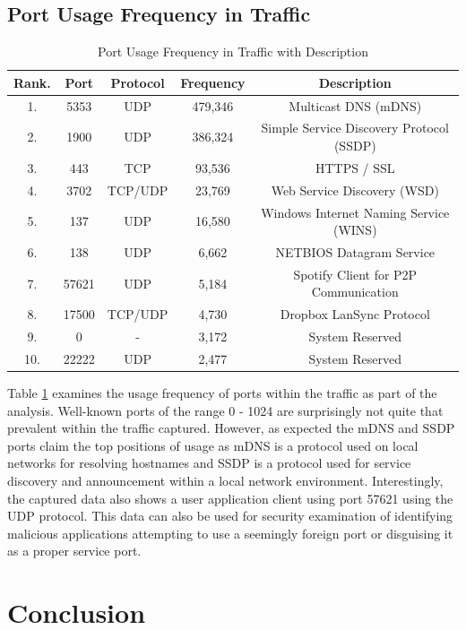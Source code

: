 \documentclass{article}
\begin{document}
\subsection{Port Usage Frequency in Traffic}

\begin{table}[H]
    \centering
    \begin{tabular}{ccccc}
         Rank. & Port & Protocol & Frequency & Description \\
         \hline
         1. & 5353 & UDP & 479,346 & Multicast DNS (mDNS)\\
         2. & 1900 & UDP & 386,324 & Simple Service Discovery Protocol (SSDP) \\
         3. & 443 & TCP & 93,536 & HTTPS / SSL\\
         4. & 3702 & TCP/UDP & 23,769 & Web Service Discovery (WSD) \\
         5. & 137 & UDP & 16,580 & Windows Internet Naming Service (WINS) \\
         6. & 138 & UDP & 6,662 & NETBIOS Datagram Service \\
         7. & 57621 & UDP & 5,184 &  Spotify Client for P2P Communication \\
         8. & 17500 & TCP/UDP & 4,730 & Dropbox LanSync Protocol \\
         9. & 0 & - & 3,172 & System Reserved \\
         10. & 22222 & UDP & 2,477 & System Reserved \\
    \end{tabular}
    \caption{Port Usage Frequency in Traffic with Description}
    \label{tab:nfport}
\end{table}

Table \ref{tab:nfport} examines the usage frequency of ports within the traffic as part of the analysis. Well-known ports of the range 0 - 1024 are surprisingly not quite that prevalent within the traffic captured. However, as expected the mDNS and SSDP ports claim the top positions of usage as mDNS is a protocol used on local networks for resolving hostnames and SSDP is a protocol used for service discovery and announcement within a local network environment. Interestingly, the captured data also shows a user application client using port 57621 using the UDP protocol. This data can also be used for security examination of identifying malicious applications attempting to use a seemingly foreign port or disguising it as a proper service port.

\section{Conclusion}
\end{document}
